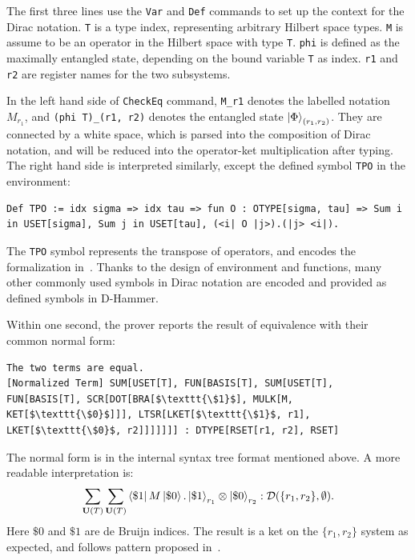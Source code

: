 The first three lines use the \texttt{\textcolor{NavyBlue}{Var}} and \texttt{\textcolor{NavyBlue}{Def}} commands to set up the context for the Dirac notation.
\texttt{T} is a type index, representing arbitrary Hilbert space types. \texttt{M} is assume to be an operator in the Hilbert space with type \texttt{T}. \texttt{phi} is defined as the maximally entangled state, depending on the bound variable \texttt{T} as index.
\texttt{r1} and \texttt{r2} are register names for the two subsystems.

In the left hand side of \texttt{\textcolor{NavyBlue}{CheckEq}} command, \texttt{M\_r1} denotes the labelled notation $M_{r_1}$, and \texttt{(phi T)\_(r1, r2)} denotes the entangled state $\ket{\Phi}_{(r_1, r_2)}$. They are connected by a white space, which is parsed into the composition of Dirac notation, and will be reduced into the operator-ket multiplication after typing. The right hand side is interpreted similarly, except the defined symbol \texttt{TPO} in the environment:

\begin{lstlisting}[style=dhammer]
Def TPO := idx sigma => idx tau => fun O : OTYPE[sigma, tau] => Sum i in USET[sigma], Sum j in USET[tau], (<i| O |j>).(|j> <i|).
\end{lstlisting}

The \texttt{TPO} symbol represents the transpose of operators, and encodes the formalization in~. Thanks to the design of environment and functions, many other commonly used symbols in Dirac notation are encoded and provided as defined symbols in D-Hammer.

Within one second, the prover reports the result of equivalence with their common normal form:
    \begin{lstlisting}[style=dhammer]
The two terms are equal.
[Normalized Term] SUM[USET[T], FUN[BASIS[T], SUM[USET[T], FUN[BASIS[T], SCR[DOT[BRA[$\texttt{\$1}$], MULK[M, KET[$\texttt{\$0}$]]], LTSR[LKET[$\texttt{\$1}$, r1], LKET[$\texttt{\$0}$, r2]]]]]]] : DTYPE[RSET[r1, r2], RSET]
    \end{lstlisting}

The normal form is in the internal syntax tree format mentioned above. A more readable interpretation is:
\[
\sum_{\mathbf{U}(T)} \sum_{\mathbf{U}(T)} \bra{\$1}M\ket{\$ 0} . \ket{\$1}_{r_1} \otimes \ket{\$0}_{r_2} : \mathcal{D}(\{r_1, r_2\}, \emptyset).
\]
Here $\$0$ and $\$1$ are de Bruijn indices. The result is a ket on the $\{r_1, r_2\}$ system as expected, and follows pattern proposed in~.



